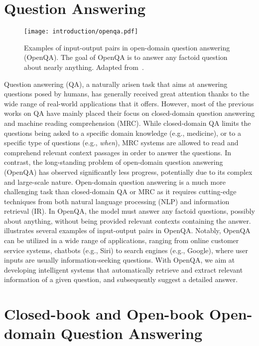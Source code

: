 \section{Question Answering}
\label{sec:qa}

\begin{figure}[!htbp]
	\centering
	\texttt{[image: introduction/openqa.pdf]}
	\caption[Examples of input-output pairs in open-domain question answering.]{
		Examples of input-output pairs in open-domain question answering (OpenQA).
		The goal of OpenQA is to answer any factoid question about nearly anything. Adapted from~\cite{chen2020open}.
	}
	\label{fig:openqa}
\end{figure}


%
Question answering (QA), a naturally arisen task that aims at answering questions posed by humans, has generally received great attention thanks to the wide range of real-world applications that it offers.
%
However, most of the previous works on QA have mainly placed their focus on closed-domain question answering and machine reading comprehension (MRC).
%
While closed-domain QA limits the questions being asked to a specific domain knowledge (e.g., medicine), or to a specific type of questions (e.g., \emph{when}), MRC systems are allowed to read and comprehend relevant context passages in order to answer the questions.
%
In contrast, the long-standing problem of open-domain question answering~\cite{voorhees1999trec} (OpenQA) has observed significantly less progress, potentially due to its complex and large-scale nature.
%
Open-domain question answering is a much more challenging task than closed-domain QA or MRC as it requires cutting-edge techniques from both natural language processing (NLP) and information retrieval (IR).
%
In OpenQA, the model must answer any factoid questions, possibly about anything, without being provided relevant contexts containing the answer.
%
 illustrates several examples of input-output pairs in OpenQA.
%
Notably, OpenQA can be utilized in a wide range of applications, ranging from online customer service systems, chatbots (e.g., Siri) to search engines (e.g., Google), where user inputs are usually information-seeking questions.
%
With OpenQA, we aim at developing intelligent systems that automatically retrieve and extract relevant information of a given question, and subsequently suggest a detailed answer.

\section{Closed-book and Open-book Open-domain Question Answering}
\label{sec:close_and_open_book}

